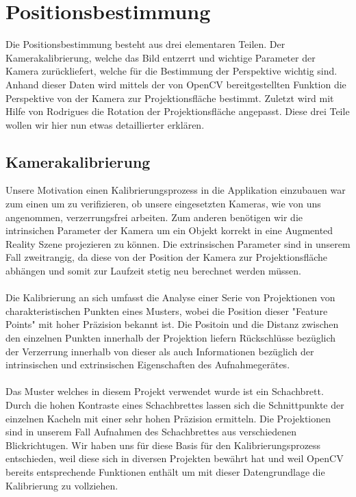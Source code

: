 \documentclass[main.tex]{subfiles}
\begin{document}
\section{Positionsbestimmung}
Die Positionsbestimmung besteht aus drei elementaren Teilen. Der Kamerakalibrierung, welche das Bild entzerrt und wichtige Parameter der Kamera zurückliefert, welche für die Bestimmung der Perspektive wichtig sind. Anhand dieser Daten wird mittels der von OpenCV bereitgestellten Funktion die Perspektive von der Kamera zur Projektionsfläche bestimmt. Zuletzt wird mit Hilfe von Rodrigues die Rotation der Projektionsfläche angepasst. Diese drei Teile wollen wir hier nun etwas detaillierter erklären.

\subsection{Kamerakalibrierung}
Unsere Motivation einen Kalibrierungsprozess in die Applikation einzubauen war zum einen um zu verifizieren, ob unsere eingesetzten Kameras, wie von uns angenommen, verzerrungsfrei arbeiten. Zum anderen benötigen wir die intrinsichen Parameter der Kamera um ein Objekt korrekt in eine Augmented Reality Szene projezieren zu können. Die extrinsischen Parameter sind in unserem Fall zweitrangig, da diese von der Position der Kamera zur Projektionsfläche abhängen und somit zur Laufzeit stetig neu berechnet werden müssen.
\paragraph{}
Die Kalibrierung an sich umfasst die Analyse einer Serie von Projektionen von charakteristischen Punkten eines Musters, wobei die Position dieser "Feature Points" mit hoher Präzision bekannt ist. Die Positoin und die Distanz zwischen den einzelnen Punkten innerhalb der Projektion liefern Rückschlüsse bezüglich der Verzerrung innerhalb von dieser als auch Informationen bezüglich der intrinsischen und extrinsischen Eigenschaften des Aufnahmegerätes. 
\paragraph{}
Das Muster welches in diesem Projekt verwendet wurde ist ein Schachbrett. Durch die hohen Kontraste eines Schachbrettes lassen sich die Schnittpunkte der einzelnen Kacheln mit einer sehr hohen Präzision ermitteln. Die Projektionen sind in unserem Fall Aufnahmen des Schachbrettes aus verschiedenen Blickrichtugen. Wir haben uns für diese Basis für den Kalibrierungsprozess entschieden, weil diese sich in diversen Projekten bewährt hat und weil OpenCV bereits entsprechende Funktionen enthält um mit dieser Datengrundlage die Kalibrierung zu vollziehen. 
\end{document}
